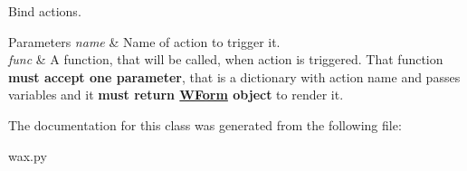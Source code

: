 Bind actions. 


\begin{DoxyParams}{Parameters}
{\em name} & Name of action to trigger it. \\
\hline
{\em func} & A function, that will be called, when action is triggered. That function {\bfseries must accept one parameter}, that is a dictionary with action name and passes variables and it {\bfseries must return \hyperlink{classwax_1_1WForm}{W\+Form} object} to render it. \\
\hline
\end{DoxyParams}


The documentation for this class was generated from the following file\+:\begin{DoxyCompactItemize}
\item 
wax.\+py\end{DoxyCompactItemize}
